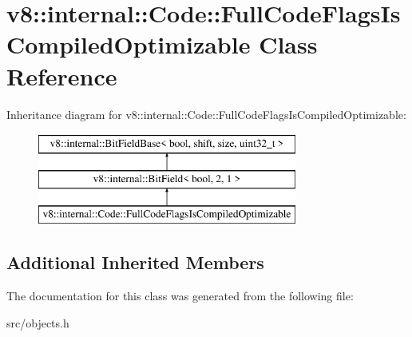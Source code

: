 \hypertarget{classv8_1_1internal_1_1_code_1_1_full_code_flags_is_compiled_optimizable}{}\section{v8\+:\+:internal\+:\+:Code\+:\+:Full\+Code\+Flags\+Is\+Compiled\+Optimizable Class Reference}
\label{classv8_1_1internal_1_1_code_1_1_full_code_flags_is_compiled_optimizable}
Inheritance diagram for v8\+:\+:internal\+:\+:Code\+:\+:Full\+Code\+Flags\+Is\+Compiled\+Optimizable\+:\begin{figure}[H]
\begin{center}
\leavevmode
\includegraphics[height=3.000000cm]{classv8_1_1internal_1_1_code_1_1_full_code_flags_is_compiled_optimizable}
\end{center}
\end{figure}
\subsection*{Additional Inherited Members}


The documentation for this class was generated from the following file\+:\begin{DoxyCompactItemize}
\item 
src/objects.\+h\end{DoxyCompactItemize}
